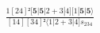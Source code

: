 \documentclass[varwidth, border=5pt]{standalone}
\begin{document}
\begin{my}
$\begin{gathered}
\scriptscriptstyle\frac{1[24]²[𝟓|𝟓|2+3|4][1|𝟓|𝟓⟩}{[14][34]²⟨1|2+3|4]s_{234}}
\end{gathered}$
\end{my}
\end{document}
